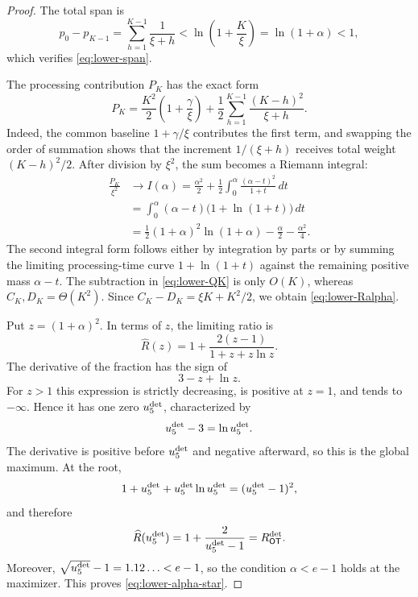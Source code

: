 \begin{proof}
The total span is
\[
 p_0-p_{K-1}
 =\sum_{h=1}^{K-1}\frac1{\xi+h}
 <\ln\!\left(1+\frac K\xi\right)
 =\ln(1+\alpha)<1,
\]
which verifies \cref{eq:lower-span}.

The processing contribution $P_K$ has the exact form
\begin{equation}
 P_K
 =\frac{K^2}{2}\left(1+\frac\gamma \xi\right)
  +\frac12\sum_{h=1}^{K-1}\frac{(K-h)^2}{\xi+h}.
 \label{eq:lower-P-exact}
\end{equation}
Indeed, the common baseline $1+\gamma/\xi$ contributes the first term, and
swapping the order of summation shows that the increment $1/(\xi+h)$ receives
total weight $(K-h)^2/2$.  After division by $\xi^2$, the sum becomes a
Riemann integral:
\begin{align}
 \frac{P_K}{\xi^2}&\longrightarrow I(\alpha)
   =\frac{\alpha^2}{2}
    +\frac12\int_0^\alpha\frac{(\alpha-t)^2}{1+t}\,dt
   \nonumber\\
 &=\int_0^\alpha(\alpha-t)\bigl(1+\ln(1+t)\bigr)\,dt
   \nonumber\\
 &=\frac12(1+\alpha)^2\ln(1+\alpha)
   -\frac\alpha2-\frac{\alpha^2}{4}.
 \label{eq:lower-I}
\end{align}
The second integral form follows either by integration by parts or by summing
the limiting processing-time curve $1+\ln(1+t)$ against the remaining
positive mass $\alpha-t$.
The subtraction in \cref{eq:lower-QK} is only $O(K)$, whereas
$C_K,D_K=\Theta(K^2)$.  Since $C_K-D_K=\xi K+K^2/2$, we obtain
\cref{eq:lower-Ralpha}.

Put $z=(1+\alpha)^2$.  In terms of $z$, the limiting ratio is
\begin{equation}
  \widehat R(z)=1+\frac{2(z-1)}{1+z+z\ln z}.
  \label{eq:lower-Rz}
\end{equation}
The derivative of the fraction has the sign of
\[
  3-z+\ln z.
\]
For $z>1$ this expression is strictly decreasing, is positive at $z=1$, and
tends to $-\infty$.  Hence it has one zero $u_{5}^{\mathrm{det}}$, characterized by
\[
  u_{5}^{\mathrm{det}}-3=\ln u_{5}^{\mathrm{det}}.
\]
The derivative is positive before $u_{5}^{\mathrm{det}}$ and negative afterward, so this is
the global maximum.  At the root,
\[
  1+u_{5}^{\mathrm{det}}+u_{5}^{\mathrm{det}}\ln u_{5}^{\mathrm{det}}=(u_{5}^{\mathrm{det}}-1)^2,
\]
and therefore
\[
  \widehat R(u_{5}^{\mathrm{det}})=1+\frac{2}{u_{5}^{\mathrm{det}}-1}=R_{\mathsf{OT}}^{\mathrm{det}}.
\]
Moreover, $\sqrt{u_{5}^{\mathrm{det}}}-1=1.12\ldots<e-1$, so the condition
$\alpha<e-1$ holds at the maximizer.  This proves
\cref{eq:lower-alpha-star}.
\end{proof}

